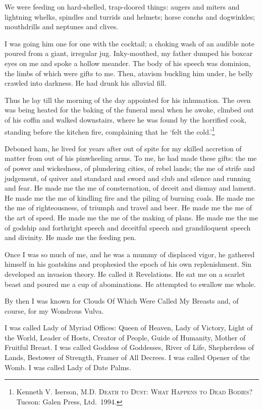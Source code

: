 \documentclass[
]{memoir}
\begin{document}
We were feeding on hard-shelled, trap-doored things: augers and miters
and lightning whelks, spindles and turrids and helmets; horse conchs and
dogwinkles; mouthdrills and neptunes and clives.

I was going him one for one with the cocktail; a choking wash of an
audible note poured from a giant, irregular jug. Inky-mouthed, my father
dumped his boxcar eyes on me and spoke a hollow meander. The body of his
speech was dominion, the limbs of which were gifts to me. Then, atavism
buckling him under, he belly crawled into darkness. He had drunk his
alluvial fill.

Thus he lay till the morning of the day appointed for his inhumation.
The oven was being heated for the baking of the funeral meal when he
awoke, climbed out of his coffin and walked downstairs, where he was
found by the horrified cook, standing before the kitchen fire,
complaining that he `felt the cold.'\footnote{Kenneth V. Iserson, M.D.
  \textsc{Death to Dust: What Happens to Dead Bodies?} Tucson: Galen
  Press, Ltd.~1994.}

Deboned ham, he lived for years after out of spite for my skilled
accretion of matter from out of his pinwheeling arms. To me, he had made
these gifts: the me of power and wickedness, of plundering cities, of
rebel lands; the me of strife and judgement, of quiver and standard and
sword and club and silence and running and fear. He made me the me of
consternation, of deceit and dismay and lament. He made me the me of
kindling fire and the piling of burning coals. He made me the me of
righteousness, of triumph and travel and beer. He made me the me of the
art of speed. He made me the me of the making of plans. He made me the
me of godship and forthright speech and deceitful speech and
grandiloquent speech and divinity. He made me the feeding pen.

Once I was so much of me, and he was a mummy of displaced vigor, he
gathered himself in his goatskins and prophesied the epoch of his own
replenishment. Sin developed an invasion theory. He called it
Revelations. He sat me on a scarlet beast and poured me a cup of
abominations. He attempted to swallow me whole.

By then I was known for Clouds Of Which Were Called My Breasts and, of
course, for my Wondrous Vulva.

I was called Lady of Myriad Offices: Queen of Heaven, Lady of Victory,
Light of the World, Leader of Hosts, Creator of People, Guide of
Humanity, Mother of Fruitful Breast. I was called Goddess of Goddesses,
River of Life, Shepherdess of Lands, Bestower of Strength, Framer of All
Decrees. I was called Opener of the Womb. I was called Lady of Date
Palms.
\end{document}
